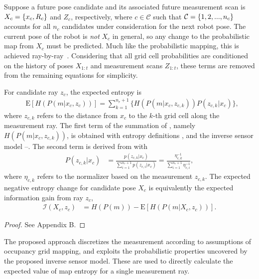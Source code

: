 Suppose a future pose candidate and its associated future measurement scan is $X_c=\left\{ x_c,R_c \right\}$ and $Z_c$, respectively, where $c\in\mathcal C$ such that $\mathcal C=\left\{ 1,2,...,n_c \right\}$ accounts for all $n_c$ candidates under consideration for the next robot pose. The current pose of the robot is \emph{not} $X_c$ in general, so any change to the probabilistic map from $X_c$ must be predicted. Much like the probabilistic mapping, this is achieved ray-by-ray~\cite{KauAiLee16,KauTakAiLee17}. Considering that all grid cell probabilities are conditioned on the history of poses $X_{1:t}$ and measurement scans $Z_{1:t}$, these terms are removed from the remaining equations for simplicity. 

\begin{prop}
\label{prop:ExpectedH}
For candidate ray $z_c$, the expected entropy is
\begin{align}
\label{eqn:DiscExpEntropyRay}
&\text{E}[H(P(m|x_c,z_{c}))]=\sum_{k=1}^{n_{r}+1}\bigg\{H(P(m|x_c,z_{c,k}))P(z_{c,k}|x_c)\bigg\},
\end{align}
where $z_{c,k}$ refers to the distance from $x_c$ to the $k$-th grid cell along the measurement ray. The first term of the summation of , namely $H(P(m|x_c,z_{c,k}))$, is obtained with entropy definitions ,  and the inverse sensor model --. The second term is derived from  with
\begin{align}
\label{eqn:ProbMeas}
P(z_{c,k}|x_c)&=\frac{p(z_{c,k}|x_c)}{\sum_{i=1}^{n_{r}+1}p(z_{c,i}|x_c)}=\frac{\eta_{c,k}^{-1}}{\sum_{i=1}^{n_{r}+1}\eta_{c,i}^{-1}},
\end{align}
where $\eta_{c,k}$ refers to the normalizer based on the measurement $z_{c,k}$.
The expected negative entropy change for candidate pose $X_c$ is equivalently the expected information gain from ray $z_c$,
\begin{align}
\label{eqn:expectedInfoGainRay}
\mathcal I(X_c,z_c)&=H(P(m))-\text{E}\left[H(P(m|X_c,z_c))\right].
\end{align}
\end{prop}
\begin{proof}%
See Appendix B.
\end{proof}

The proposed approach discretizes the measurement according to assumptions of occupancy grid mapping, and exploits the probabilistic properties uncovered by the proposed inverse sensor model. These are used to directly calculate the expected value of map entropy for a single measurement ray. 





